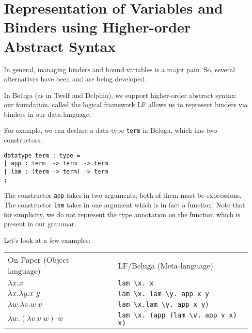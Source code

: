 \section{Representation of Variables and Binders using Higher-order Abstract Syntax}
In general, managing binders and bound variables is a major pain. So,
several alternatives have been and are being developed.

In Beluga (as in Twelf and Delphin), we support higher-order abstract syntax: our foundation, called the logical framework LF \cite{Harper93jacm} allows us to represent binders via binders in our data-language.

For example, we can declare a data-type \lstinline!term! in Beluga,
which has two constructors.

\begin{lstlisting}
datatype term : type =
| app : term  -> term  -> term
| lam : (term -> term) -> term
;
\end{lstlisting}

The constructor \lstinline!app! takes in two arguments; both of them
must be expressions. The constructor \lstinline!lam! takes in one
argument which is in fact a function! Note that for simplicity, we do
not represent the type annotation on the function which is present in
our grammar.

Let's look at a few examples:




\begin{center}
  \begin{tabular}{lp{0.25cm}l}
On Paper (Object language)     & & LF/Beluga (Meta-language)\\
$\lambda x.x$ & & \lstinline!lam \x. x! \\
$\lambda x.\lambda y. x\;y$ & &
\lstinline!lam \x. lam \y. app x y! \\
$\lambda w.\lambda v. w\;v$ & &
\lstinline!lam \x.lam \y. app x y)! \\
$\lambda w. (\lambda v. v\;w) \;w$
&& \lstinline!lam \x. (app (lam \v. app v x) x)!
  \end{tabular}
\end{center}



